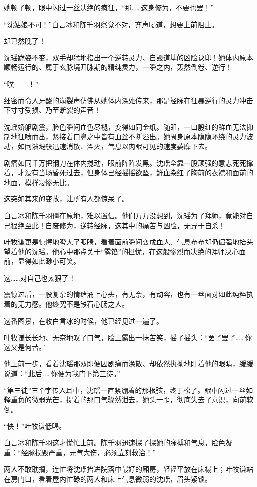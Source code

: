 她顿了顿，眼中闪过一丝决绝的疯狂，“那……这身修为，不要也罢！”

“沈姑娘不可！”白言冰和陈千羽察觉不对，齐声喝道，想要上前阻止。

却已然晚了！

沈瑶跪姿不变，双手却猛地掐出一个逆转灵力、自毁道基的凶险诀印！她体内原本顺畅运行的、属于玄脉境开脉期的精纯灵力，一瞬之内，轰然倒卷、逆行！

“噗——！”

细密而令人牙酸的崩裂声仿佛从她体内深处传来，那是经脉在狂暴逆行的灵力冲击下寸寸受损、乃至断裂的声音！

沈瑶娇躯剧震，脸色瞬间血色尽褪，变得如同金纸。随即，一口殷红的鲜血无法抑制地狂喷而出，紧接着口鼻之中皆有血丝不断溢出。她周身原本隐隐环绕的灵力波动，如同溃堤般迅速消散、湮灭，气息以肉眼可见的速度萎靡下去。

剧痛如同千万把钢刀在体内搅动，眼前阵阵发黑。沈瑶全靠一股顽强的意志死死撑着，才没有当场昏死过去，但身体已经摇摇欲坠，鲜血染红了胸前的衣襟和面前的地面，模样凄惨无比。

这突如其来的变故，让所有人都惊呆了。

白言冰和陈千羽僵在原地，难以置信。他们万万没想到，沈瑶为了拜师，竟能对自己狠绝至此！自废修为，逆转经脉，这其中的痛苦与凶险，无异于自杀！

叶牧谦更是惊愕地瞪大了眼睛，看着面前瞬间变成血人、气息奄奄却仍倔强地抬头望着他的沈瑶。他心中那点关于“露馅”的担忧，在这般惨烈而决绝的拜师决心面前，显得如此渺小可笑。

这……对自己也太狠了！

震惊过后，一股复杂的情绪涌上心头，有无奈，有动容，也有一丝面对如此纯粹执着的无力感。他终究不是铁石心肠之人。

这番图景，在收白言冰的时候，他已经见过一遍了。

叶牧谦长长地、无奈地叹了口气，脸上露出一抹苦笑，摇了摇头：“罢了罢了……你这又是何苦。”

他上前一步，看着沈瑶那双即便因剧痛而涣散、却依然执拗地盯着他的眼睛，缓缓说道：“此后……你便为我门下第三徒。”

“第三徒”三个字传入耳中，沈瑶一直紧绷着的那根弦，终于松了。眼中闪过一丝如释重负的微弱光芒，提着的那口气骤然泄去，她头一歪，彻底失去了意识，向前软倒。

“快！”叶牧谦低喝。

白言冰和陈千羽这才慌忙上前。陈千羽迅速探了探她的脉搏和气息，脸色凝重：“经脉损毁严重，元气大伤，必须立刻救治！”

两人不敢耽搁，连忙将沈瑶抬进院落中最好的厢房，轻轻平放在床榻上；叶牧谦站在房门口，看着屋内忙碌的两人和床上气息微弱的沈瑶，眉头紧锁。

